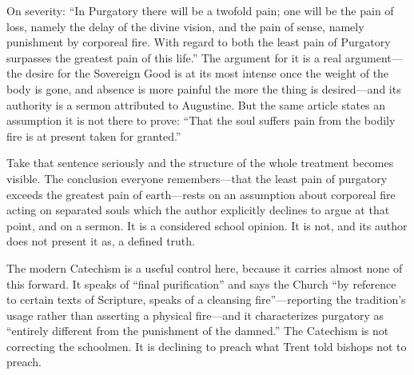 On severity: ``In Purgatory there will be a twofold pain; one will be the pain of loss, namely the delay of the divine vision, and the pain of sense, namely punishment by corporeal fire. With regard to both the least pain of Purgatory surpasses the greatest pain of this life.'' The argument for it is a real argument---the desire for the Sovereign Good is at its most intense once the weight of the body is gone, and absence is more painful the more the thing is desired---and its authority is a sermon attributed to Augustine. But the same article states an assumption it is not there to prove: ``That the soul suffers pain from the bodily fire is at present taken for granted.''

Take that sentence seriously and the structure of the whole treatment becomes visible. The conclusion everyone remembers---that the least pain of purgatory exceeds the greatest pain of earth---rests on an assumption about corporeal fire acting on separated souls which the author explicitly declines to argue at that point, and on a sermon. It is a considered school opinion. It is not, and its author does not present it as, a defined truth.

The modern Catechism is a useful control here, because it carries almost none of this forward. It speaks of ``final purification'' and says the Church ``by reference to certain texts of Scripture, speaks of a cleansing fire''---reporting the tradition's usage rather than asserting a physical fire---and it characterizes purgatory as ``entirely different from the punishment of the damned.'' The Catechism is not correcting the schoolmen. It is declining to preach what Trent told bishops not to preach.

